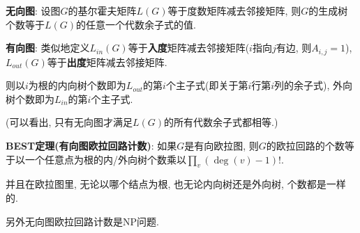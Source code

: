 \textbf{无向图}: 设图$G$的基尔霍夫矩阵$L(G)$等于度数矩阵减去邻接矩阵, 则$G$的生成树个数等于$L(G)$的任意一个代数余子式的值.

\textbf{有向图}: 类似地定义$L_{in}(G)$等于\textbf{入度}矩阵减去邻接矩阵($i$指向$j$有边, 则$A_{i, j} = 1$), $L_{out}(G)$等于\textbf{出度}矩阵减去邻接矩阵.

则以$i$为根的内向树个数即为$L_{out}$的第$i$个主子式(即关于第$i$行第$i$列的余子式), 外向树个数即为$L_{in}$的第$i$个主子式.

(可以看出, 只有无向图才满足$L(G)$的所有代数余子式都相等.)

\textbf{BEST定理(有向图欧拉回路计数)}: 如果$G$是有向欧拉图, 则$G$的欧拉回路的个数等于以一个任意点为根的内/外向树个数乘以$\prod_v (\deg(v) - 1) !$.

并且在欧拉图里, 无论以哪个结点为根, 也无论内向树还是外向树, 个数都是一样的.

另外无向图欧拉回路计数是NP问题.